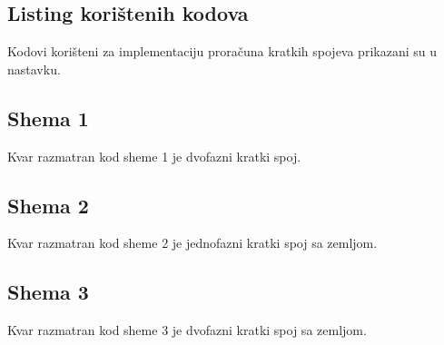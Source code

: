 \newpage
\begin{appendix}
\section{Listing korištenih kodova}

Kodovi korišteni za implementaciju proračuna kratkih spojeva prikazani su u nastavku.

\subsection{Shema 1}
Kvar razmatran kod sheme 1 je dvofazni kratki spoj.



%

\subsection{Shema 2}
Kvar razmatran kod sheme 2 je jednofazni kratki spoj sa zemljom.



%

\subsection{Shema 3}
Kvar razmatran kod sheme 3 je dvofazni kratki spoj sa zemljom.



%

\end{appendix}